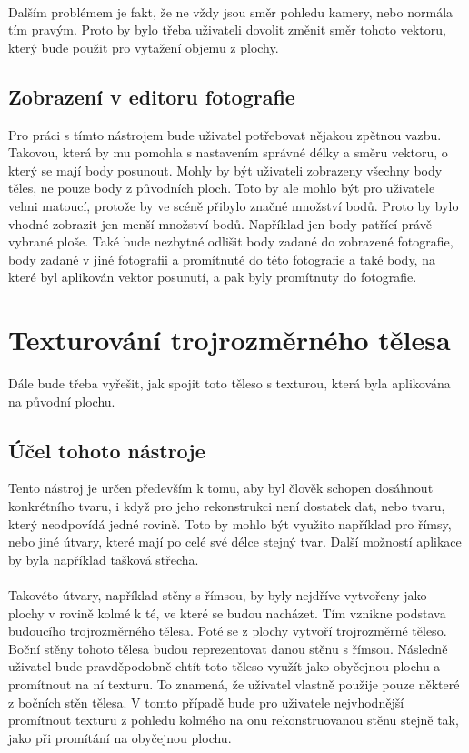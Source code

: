 \documentclass[11pt,twoside,a4paper]{book}
\begin{document}
\paragraph{}
Dalším problémem je fakt, že ne vždy jsou směr pohledu kamery, nebo normála tím pravým. Proto by bylo třeba uživateli dovolit změnit směr tohoto vektoru, který bude použit pro vytažení objemu z plochy.

\subsection{Zobrazení v editoru fotografie}
\label{zobrazeniExtrude}
Pro práci s tímto nástrojem bude uživatel potřebovat nějakou zpětnou vazbu. Takovou, která by mu pomohla s nastavením správné délky a směru vektoru, o který se mají body posunout. Mohly by být uživateli zobrazeny všechny body těles, ne pouze body z původních ploch. Toto by ale mohlo být pro uživatele velmi matoucí, protože by ve scéně přibylo značné množství bodů. Proto by bylo vhodné zobrazit jen menší množství bodů. Například jen body patřící právě vybrané ploše. Také bude nezbytné odlišit body zadané do zobrazené fotografie, body zadané v jiné fotografii a promítnuté do této fotografie a také body, na které byl aplikován vektor posunutí, a pak byly promítnuty do fotografie.

\section{Texturování trojrozměrného tělesa}
Dále bude třeba vyřešit, jak spojit toto těleso s texturou, která byla aplikována na původní plochu. 

\subsection{Účel tohoto nástroje}
\label{teturovaniTelesa}
Tento nástroj je určen především k tomu, aby byl člověk schopen dosáhnout konkrétního tvaru, i když pro jeho rekonstrukci není dostatek dat, nebo tvaru, který neodpovídá jedné rovině. Toto by mohlo být využito například pro římsy, nebo jiné útvary, které mají po celé své délce stejný tvar. Další možností aplikace by byla například tašková střecha.
\paragraph{}
Takovéto útvary, například stěny s římsou, by byly nejdříve vytvořeny jako plochy v rovině kolmé k té, ve které se budou nacházet. Tím vznikne podstava budoucího trojrozměrného tělesa. Poté se z plochy vytvoří trojrozměrné těleso. Boční stěny tohoto tělesa budou reprezentovat danou stěnu s římsou. Následně uživatel bude pravděpodobně chtít toto těleso využít jako obyčejnou plochu a promítnout na ní texturu. To znamená, že uživatel vlastně použije pouze některé z bočních stěn tělesa. V tomto případě bude pro uživatele nejvhodnější promítnout texturu z pohledu kolmého na onu rekonstruovanou stěnu stejně tak, jako při promítání na obyčejnou plochu.
\end{document}
